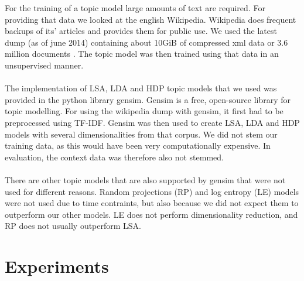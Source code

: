 For the training of a topic model large amounts of text are required. For providing that data we looked at the english Wikipedia. Wikipedia does frequent backups of its' articles and provides them for public use. We used the latest dump (as of june 2014) containing about 10GiB of compressed xml data or 3.6 million documents \cite{wikidumps}. The topic model was then trained using that data in an unsupervised manner.\\\\
The implementation of LSA, LDA and HDP topic models that we used was provided in the python library gensim. Gensim is a free, open-source library for topic modelling. For using the wikipedia dump with gensim, it first had to be preprocessed using TF-IDF. Gensim was then used to create LSA, LDA and HDP models with several dimensionalities from that corpus. We did not stem our training data, as this would have been very computationally expensive. In evaluation, the context data was therefore also not stemmed.\\\\
There are other topic models that are also supported by gensim that were not used for different reasons. Random projections (RP) \cite{RandomProjections, gensimRP} and log entropy (LE) \cite{LogEntropy, gensimLE} models were not used due to time contraints, but also because we did not expect them to outperform our other models. LE does not perform dimensionality reduction, and RP does not usually outperform LSA. 






\section{Experiments}
